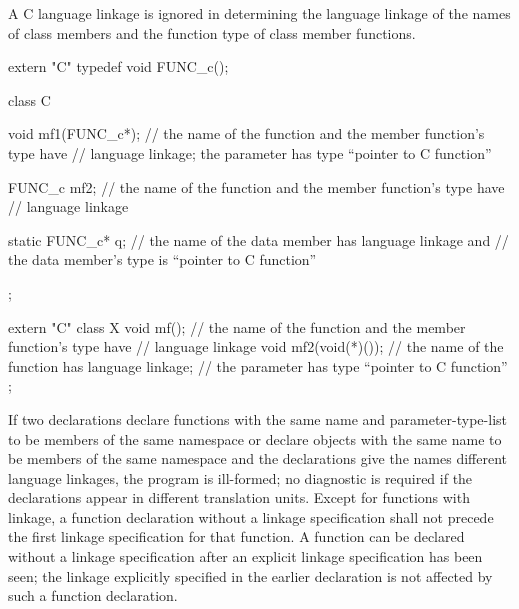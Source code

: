 %
A C language linkage is ignored
in determining the language linkage of
the names of class members and the
function type of class member functions.
\begin{example}
\begin{codeblock}
extern "C" typedef void FUNC_c();

class C {
  void mf1(FUNC_c*);            // the name of the function  and the member function's type have
                                // \Cpp{} language linkage; the parameter has type ``pointer to C function''

  FUNC_c mf2;                   // the name of the function  and the member function's type have
                                // \Cpp{} language linkage

  static FUNC_c* q;             // the name of the data member  has \Cpp{} language linkage and
                                // the data member's type is ``pointer to C function''
};

extern "C" {
  class X {
    void mf();                  // the name of the function  and the member function's type have
                                // \Cpp{} language linkage
    void mf2(void(*)());        // the name of the function  has \Cpp{} language linkage;
                                // the parameter has type ``pointer to C function''
  };
}
\end{codeblock}
\end{example}

\pnum
If two declarations declare functions with the same name and
parameter-type-list to be members of the same
namespace or declare objects with the same name to be members of the same
namespace and the declarations give the names different language linkages, the
program is ill-formed; no diagnostic is required if the declarations appear in
different translation units.
%
Except for functions with \Cpp{} linkage, a function declaration without a
linkage specification shall not precede the first linkage specification
for that function. A function can be declared without a linkage
specification after an explicit linkage specification has been seen; the
linkage explicitly specified in the earlier declaration is not affected
by such a function declaration.


